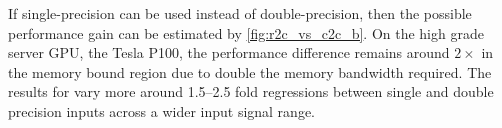 If single-precision can be used instead of double-precision, then the possible performance gain can be estimated by \cref{fig:r2c_vs_c2c_b}. On the high grade server GPU, the \nvidia{} Tesla P100, the performance difference remains around $2{\times}$ in the memory bound region due to double the memory bandwidth required. The results for \fftw{} vary more around \numrange{1.5}{2.5} fold regressions between single and double precision inputs across a wider input signal range. 

